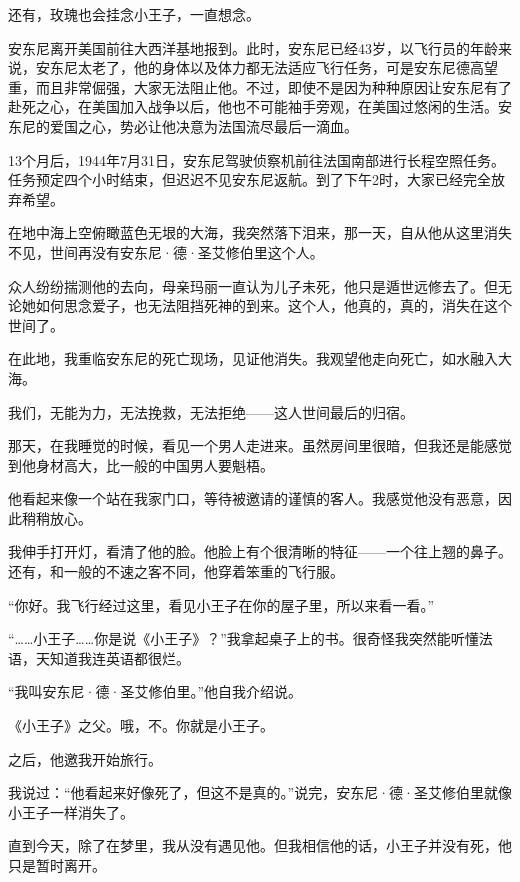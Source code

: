 还有，玫瑰也会挂念小王子，一直想念。


\stoptitle

\starttitle[title={14}]

安东尼离开美国前往大西洋基地报到。此时，安东尼已经43岁，以飞行员的年龄来说，安东尼太老了，他的身体以及体力都无法适应飞行任务，可是安东尼德高望重，而且非常倔强，大家无法阻止他。不过，即使不是因为种种原因让安东尼有了赴死之心，在美国加入战争以后，他也不可能袖手旁观，在美国过悠闲的生活。安东尼的爱国之心，势必让他决意为法国流尽最后一滴血。

13个月后，1944年7月31日，安东尼驾驶侦察机前往法国南部进行长程空照任务。任务预定四个小时结束，但迟迟不见安东尼返航。到了下午2时，大家已经完全放弃希望。

在地中海上空俯瞰蓝色无垠的大海，我突然落下泪来，那一天，自从他从这里消失不见，世间再没有安东尼·德·圣艾修伯里这个人。

众人纷纷揣测他的去向，母亲玛丽一直认为儿子未死，他只是遁世远修去了。但无论她如何思念爱子，也无法阻挡死神的到来。这个人，他真的，真的，消失在这个世间了。

在此地，我重临安东尼的死亡现场，见证他消失。我观望他走向死亡，如水融入大海。

我们，无能为力，无法挽救，无法拒绝------这人世间最后的归宿。

那天，在我睡觉的时候，看见一个男人走进来。虽然房间里很暗，但我还是能感觉到他身材高大，比一般的中国男人要魁梧。

他看起来像一个站在我家门口，等待被邀请的谨慎的客人。我感觉他没有恶意，因此稍稍放心。

我伸手打开灯，看清了他的脸。他脸上有个很清晰的特征------一个往上翘的鼻子。还有，和一般的不速之客不同，他穿着笨重的飞行服。

“你好。我飞行经过这里，看见小王子在你的屋子里，所以来看一看。”

“\ldots{}\ldots{}小王子\ldots{}\ldots{}你是说《小王子》？”我拿起桌子上的书。很奇怪我突然能听懂法语，天知道我连英语都很烂。

“我叫安东尼·德·圣艾修伯里。”他自我介绍说。

《小王子》之父。哦，不。你就是小王子。

之后，他邀我开始旅行。

我说过：“他看起来好像死了，但这不是真的。”说完，安东尼·德·圣艾修伯里就像小王子一样消失了。

直到今天，除了在梦里，我从没有遇见他。但我相信他的话，小王子并没有死，他只是暂时离开。

\stoptitle